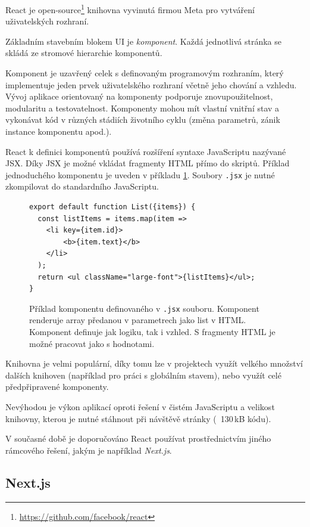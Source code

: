 React je open-source\footnote{\href{https://github.com/facebook/react}{https://github.com/facebook/react}} knihovna vyvinutá firmou Meta pro vytváření uživatelských rozhraní.

Základním stavebním blokem UI je \emph{komponent}.
Každá jednotlivá stránka se skládá ze stromové hierarchie komponentů.

Komponent je uzavřený celek s definovaným programovým rozhraním, který implementuje jeden prvek uživatelského rozhraní včetně jeho chování a vzhledu.
Vývoj aplikace orientovaný na komponenty podporuje znovupoužitelnost, modularitu a testovatelnost.
Komponenty mohou mít vlastní vnitřní stav a vykonávat kód v různých stádiích životního cyklu (změna parametrů, zánik instance komponentu apod.).

React k definici komponentů používá rozšíření syntaxe JavaScriptu nazývané JSX.
Díky JSX je možné vkládat fragmenty HTML přímo do skriptů.
Příklad jednoduchého komponentu je uveden v příkladu \ref{jsx}.
Soubory \texttt{.jsx} je nutné zkompilovat do standardního JavaScriptu. 

\begin{figure}[hbtp]
    \begin{lstlisting}[]
export default function List({items}) {
  const listItems = items.map(item =>
    <li key={item.id}>
        <b>{item.text}</b>
    </li>
  );
  return <ul className="large-font">{listItems}</ul>;
}
    \end{lstlisting}
    \caption{Příklad komponentu definovaného v \texttt{.jsx} souboru. Komponent renderuje array předanou v parametrech jako list v HTML. Komponent definuje jak logiku, tak i vzhled. S fragmenty HTML je možné pracovat jako s hodnotami.}
    \label{jsx}
\end{figure}

Knihovna je velmi populární, díky tomu lze v projektech využít velkého množství dalších knihoven (například pro práci s globálním stavem), nebo využít celé předpřipravené komponenty.

Nevýhodou je výkon aplikací oproti řešení v čistém JavaScriptu a velikost knihovny, kterou je nutné stáhnout při návštěvě stránky (~130\,kB kódu).

V současné době je doporučováno React používat prostřednictvím jiného rámcového řešení, jakým je například \emph{Next.js}.

\subsection{Next.js}

